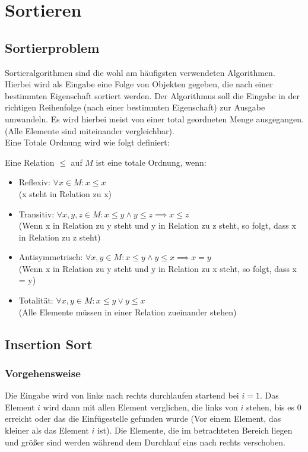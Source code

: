 \documentclass[
../../AuD-Zusammenfassung.tex,
]
{subfiles}
\begin{document}
\section{Sortieren}
\subsection{Sortierproblem}
Sortieralgorithmen sind die wohl am häufigsten verwendeten Algorithmen. Hierbei wird als Eingabe eine Folge von Objekten gegeben, die nach einer bestimmten Eigenschaft sortiert werden. Der Algorithmus soll die Eingabe in der richtigen Reihenfolge (nach einer bestimmten Eigenschaft) zur Ausgabe umwandeln. Es wird hierbei meist von einer total geordneten Menge ausgegangen. (Alle Elemente sind miteinander vergleichbar). \\
Eine Totale Ordnung wird wie folgt definiert:
\begin{center}
    Eine Relation $\leq$ auf $M$ ist eine totale Ordnung, wenn:
    \begin{itemize}
        \item Reflexiv: $\forall x \in M: x \leq x$ \\
        (x steht in Relation zu x)
        \item Transitiv: $\forall x,y,z \in M: x \leq y \wedge y \leq z \implies x \leq z$ \\
        (Wenn x in Relation zu y steht und y in Relation zu z steht, so folgt, dass x in Relation zu z steht)
        \item Antisymmetrisch: $\forall x,y \in M: x \leq y \wedge y \leq x \implies x = y$ \\
        (Wenn x in Relation zu y steht und y in Relation zu x steht, so folgt, dass x = y)
        \item Totalität: $\forall x,y \in M: x \leq y \vee y \leq x$ \\
        (Alle Elemente müssen in einer Relation zueinander stehen)
    \end{itemize}
\end{center}
\newpage
\subsection{Insertion Sort}


\subsubsection{Vorgehensweise}
Die Eingabe wird von links nach rechts durchlaufen startend bei $i = 1$. Das Element $i$ wird dann mit allen Element verglichen, die links von $i$ stehen, bis es 0 erreicht oder das die Einfügestelle gefunden wurde (Vor einem Element, das kleiner als das Element $i$ ist). Die Elemente, die im betrachteten Bereich liegen und größer sind werden während dem Durchlauf eins nach rechts verschoben.
\end{document}
